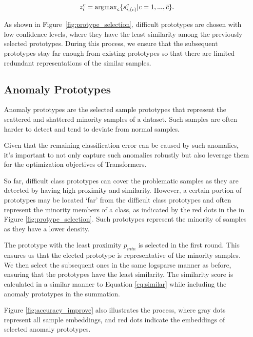 \documentclass[letterpaper]{article} \usepackage{aaai22}  \usepackage{times}  \usepackage{helvet}  \usepackage{courier}  \usepackage{amsmath,amssymb}
\begin{document}
\begin{equation}
 {z^{c}_{i}}=\operatorname{argmax}_{c} \{s^{c}_{i,(c)}|c=1,...,\Bar{c}\}.
\end{equation}

As shown in Figure~\ref{fig:protype_selection}, difficult prototypes are chosen with low confidence levels, where they have the least similarity among the previously selected prototypes. During this process, we ensure that the subsequent prototypes stay far enough from existing prototypes so that there are limited redundant representations of the similar samples.





\subsection{Anomaly Prototypes}
\label{subsec:ap}

Anomaly prototypes are the selected sample prototypes that represent the scattered and shattered minority samples of a dataset. Such samples are often harder to detect and tend to deviate from normal samples. 

Given that the remaining classification error can be caused by such anomalies, it's important to not only capture such anomalies robustly but also leverage them for the optimization objectives of Transformers.

So far, difficult class prototypes can cover the problematic samples as they are detected by having high proximity and similarity.
However, a certain portion of prototypes may be located `far' from the difficult class prototypes and often represent the minority members of a class, as indicated by the red dots in the in Figure \ref{fig:protype_selection}. Such prototypes represent the minority of samples as they have a lower density.


The prototype with the least proximity $p_{min}$ is selected in the first round.
This ensures us that the elected prototype is representative of the minority samples. We then select the subsequent ones in the same logsparse manner as before, ensuring that the prototypes have the least similarity. 
The similarity score is calculated in a similar manner to Equation \eqref{eq:similar} while including the anomaly prototypes in the summation.





Figure \ref{fig:accuracy_improve} also illustrates the process, where gray dots represent all sample embeddings, and red dots indicate the embeddings of selected anomaly prototypes. 
\end{document}
